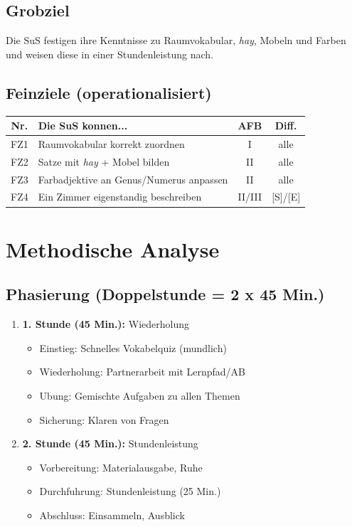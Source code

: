 \documentclass[11pt,a4paper]{article}
\begin{document}
\subsection{Grobziel}
Die SuS festigen ihre Kenntnisse zu Raumvokabular, \textit{hay}, Mobeln und Farben und weisen diese in einer Stundenleistung nach.

\subsection{Feinziele (operationalisiert)}
\begin{tabular}{|c|p{8cm}|c|c|}
\hline
\textbf{Nr.} & \textbf{Die SuS konnen...} & \textbf{AFB} & \textbf{Diff.} \\
\hline
FZ1 & Raumvokabular korrekt zuordnen & I & alle \\
\hline
FZ2 & Satze mit \textit{hay} + Mobel bilden & II & alle \\
\hline
FZ3 & Farbadjektive an Genus/Numerus anpassen & II & alle \\
\hline
FZ4 & Ein Zimmer eigenstandig beschreiben & II/III & [S]/[E] \\
\hline
\end{tabular}

\section{Methodische Analyse}

\subsection{Phasierung (Doppelstunde = 2 x 45 Min.)}
\begin{enumerate}
    \item \textbf{1. Stunde (45 Min.):} Wiederholung
    \begin{itemize}
        \item Einstieg: Schnelles Vokabelquiz (mundlich)
        \item Wiederholung: Partnerarbeit mit Lernpfad/AB
        \item Ubung: Gemischte Aufgaben zu allen Themen
        \item Sicherung: Klaren von Fragen
    \end{itemize}
    \item \textbf{2. Stunde (45 Min.):} Stundenleistung
    \begin{itemize}
        \item Vorbereitung: Materialausgabe, Ruhe
        \item Durchfuhrung: Stundenleistung (25 Min.)
        \item Abschluss: Einsammeln, Ausblick
    \end{itemize}
\end{enumerate}
\end{document}

